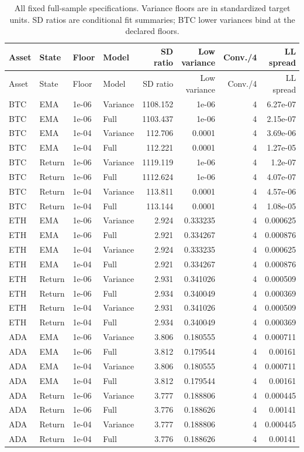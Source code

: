 {\footnotesize
\begin{longtable}{llllrrrr}
\caption{All fixed full-sample specifications. Variance floors are in standardized target units. SD ratios are conditional fit summaries; BTC lower variances bind at the declared floors.}\label{tab:regime_floor_sensitivity}\\
\toprule Asset & State & Floor & Model & SD ratio & Low variance & Conv./4 & LL spread\\\midrule\endfirsthead
\toprule Asset & State & Floor & Model & SD ratio & Low variance & Conv./4 & LL spread\\\midrule\endhead
\bottomrule\endfoot
BTC & EMA & 1e-06 & Variance & 1108.152 & 1e-06 & 4 & 6.27e-07\\
BTC & EMA & 1e-06 & Full & 1103.437 & 1e-06 & 4 & 2.15e-07\\
BTC & EMA & 1e-04 & Variance & 112.706 & 0.0001 & 4 & 3.69e-06\\
BTC & EMA & 1e-04 & Full & 112.221 & 0.0001 & 4 & 1.27e-05\\
BTC & Return & 1e-06 & Variance & 1119.119 & 1e-06 & 4 & 1.2e-07\\
BTC & Return & 1e-06 & Full & 1112.624 & 1e-06 & 4 & 4.07e-07\\
BTC & Return & 1e-04 & Variance & 113.811 & 0.0001 & 4 & 4.57e-06\\
BTC & Return & 1e-04 & Full & 113.144 & 0.0001 & 4 & 1.08e-05\\
ETH & EMA & 1e-06 & Variance & 2.924 & 0.333235 & 4 & 0.000625\\
ETH & EMA & 1e-06 & Full & 2.921 & 0.334267 & 4 & 0.000876\\
ETH & EMA & 1e-04 & Variance & 2.924 & 0.333235 & 4 & 0.000625\\
ETH & EMA & 1e-04 & Full & 2.921 & 0.334267 & 4 & 0.000876\\
ETH & Return & 1e-06 & Variance & 2.931 & 0.341026 & 4 & 0.000509\\
ETH & Return & 1e-06 & Full & 2.934 & 0.340049 & 4 & 0.000369\\
ETH & Return & 1e-04 & Variance & 2.931 & 0.341026 & 4 & 0.000509\\
ETH & Return & 1e-04 & Full & 2.934 & 0.340049 & 4 & 0.000369\\
ADA & EMA & 1e-06 & Variance & 3.806 & 0.180555 & 4 & 0.000711\\
ADA & EMA & 1e-06 & Full & 3.812 & 0.179544 & 4 & 0.00161\\
ADA & EMA & 1e-04 & Variance & 3.806 & 0.180555 & 4 & 0.000711\\
ADA & EMA & 1e-04 & Full & 3.812 & 0.179544 & 4 & 0.00161\\
ADA & Return & 1e-06 & Variance & 3.777 & 0.188806 & 4 & 0.000445\\
ADA & Return & 1e-06 & Full & 3.776 & 0.188626 & 4 & 0.00141\\
ADA & Return & 1e-04 & Variance & 3.777 & 0.188806 & 4 & 0.000445\\
ADA & Return & 1e-04 & Full & 3.776 & 0.188626 & 4 & 0.00141\\
\end{longtable}
}

